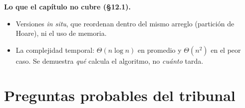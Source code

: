 \documentclass[11pt,a4paper]{article}
\begin{document}
\textbf{Lo que el capítulo no cubre (§12.1).}
\begin{itemize}
  \item Versiones \emph{in situ}, que reordenan dentro del mismo arreglo
    (partición de Hoare), ni el uso de memoria.
  \item La complejidad temporal: \(\Theta(n\log n)\) en promedio y
    \(\Theta(n^2)\) en el peor caso. Se demuestra \emph{qué} calcula el
    algoritmo, no \emph{cuánto} tarda.
\end{itemize}

\section{Preguntas probables del tribunal}
\end{document}
